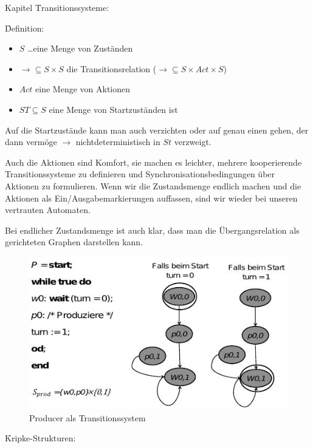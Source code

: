 \begin{chapter}{Kapitel}
\f{Transitionssysteme}:

\f{Definition}: 
\begin{itemize}
 \item $S$ \dots eine Menge von Zuständen 
 \item $\rightarrow \subseteq S\times S$ die Transitionsrelation ($\rightarrow \subseteq S\times Act \times S$)
 \item $Act$ eine Menge von Aktionen 
 \item $ST \subseteq S$ eine Menge von Startzuständen ist 
\end{itemize}

\noindent Auf die Startzustände kann man auch verzichten oder auf genau einen gehen, der dann vermöge $\rightarrow$ nichtdeterministisch in $St$ verzweigt.
\vspace*{4pt}

\noindent Auch die Aktionen sind Komfort, sie machen es leichter, mehrere kooperierende Transitionssysteme zu definieren und Synchronisationsbedingungen über Aktionen zu 
formulieren. Wenn wir die Zustandsmenge endlich machen und die Aktionen als Ein/Ausgabemarkierungen auffassen, sind wir wieder bei unseren vertrauten Automaten.
\vspace*{4pt}

\noindent Bei endlicher Zustandsmenge ist auch klar, dass man die Übergangsrelation als gerichteten Graphen darstellen kann. 
\begin{figure}[!ht]
 \centering
 \includegraphics[scale=0.8]{pics/transitionssystem}
 \caption{Producer als Transitionssystem}
\end{figure}

\f{Kripke-Strukturen}:
\vspace*{4pt}


\end{chapter}
